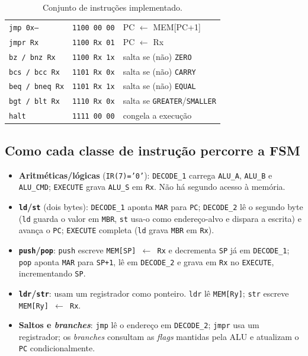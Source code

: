 \documentclass[12pt,a4paper]{article}
\begin{document}
\begin{table}[H]
\begin{tabular}{lll}
\texttt{jmp 0x--}    & \texttt{1100 00 00} & PC $\leftarrow$ MEM[PC+1] \\
\texttt{jmpr Rx}     & \texttt{1100 Rx 01} & PC $\leftarrow$ Rx \\
\texttt{bz / bnz Rx} & \texttt{1100 Rx 1x} & salta se (não) \texttt{ZERO} \\
\texttt{bcs / bcc Rx}& \texttt{1101 Rx 0x} & salta se (não) \texttt{CARRY} \\
\texttt{beq / bneq Rx}& \texttt{1101 Rx 1x}& salta se (não) \texttt{EQUAL} \\
\texttt{bgt / blt Rx}& \texttt{1110 Rx 0x} & salta se \texttt{GREATER}/\texttt{SMALLER} \\
\texttt{halt}        & \texttt{1111 00 00} & congela a execução \\
\hline
\end{tabular}
\caption{Conjunto de instruções implementado.}
\label{tab:isa}
\end{table}

\subsection{Como cada classe de instrução percorre a FSM}

\begin{itemize}
    \item \textbf{Aritméticas/lógicas} (\texttt{IR(7)='0'}): \texttt{DECODE\_1} carrega
          \texttt{ALU\_A}, \texttt{ALU\_B} e \texttt{ALU\_CMD}; \texttt{EXECUTE} grava
          \texttt{ALU\_S} em \texttt{Rx}. Não há segundo acesso à memória.
    \item \textbf{\texttt{ld}/\texttt{st}} (dois bytes): \texttt{DECODE\_1} aponta
          \texttt{MAR} para \texttt{PC}; \texttt{DECODE\_2} lê o segundo byte
          (\texttt{ld} guarda o valor em \texttt{MBR}, \texttt{st} usa-o como endereço-alvo e
          dispara a escrita) e avança o \texttt{PC}; \texttt{EXECUTE} completa
          (\texttt{ld} grava \texttt{MBR} em \texttt{Rx}).
    \item \textbf{\texttt{push}/\texttt{pop}}: \texttt{push} escreve
          \texttt{MEM[SP] $\leftarrow$ Rx} e decrementa \texttt{SP} já em \texttt{DECODE\_1};
          \texttt{pop} aponta \texttt{MAR} para \texttt{SP+1}, lê em \texttt{DECODE\_2} e
          grava em \texttt{Rx} no \texttt{EXECUTE}, incrementando \texttt{SP}.
    \item \textbf{\texttt{ldr}/\texttt{str}}: usam um registrador como ponteiro. \texttt{ldr}
          lê \texttt{MEM[Ry]}; \texttt{str} escreve \texttt{MEM[Ry] $\leftarrow$ Rx}.
    \item \textbf{Saltos e \textit{branches}}: \texttt{jmp} lê o endereço em
          \texttt{DECODE\_2}; \texttt{jmpr} usa um registrador; os \textit{branches}
          consultam as \textit{flags} mantidas pela ALU e atualizam o \texttt{PC}
          condicionalmente.
\end{itemize}
\end{document}
